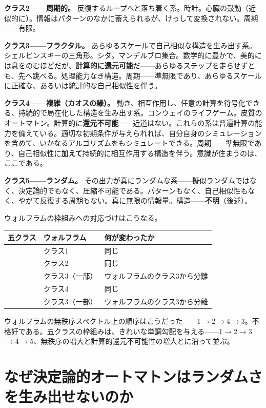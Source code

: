 \documentclass[11pt, twoside, openright]{book}
\begin{document}
\textbf{クラス2------周期的。} 反復するループへと落ち着く系。時計。心臓の鼓動（近似的に）。情報はパターンのなかに蓄えられるが、けっして変換されない。周期------有限。

\textbf{クラス3------フラクタル。} あらゆるスケールで自己相似な構造を生み出す系。シェルピンスキーの三角形。シダ。マンデルブロ集合。数学的に豊かで、美的には息をのむほどだが、\textbf{計算的に還元可能}だ------あらゆるステップを走らせずとも、先へ跳べる。処理能力なき構造。周期------準無限であり、あらゆるスケールに正確な、あるいは統計的な自己相似性を伴う。

\textbf{クラス4------複雑（カオスの縁）。} 動き、相互作用し、任意の計算を符号化できる、持続的で局在化した構造を生み出す系。コンウェイのライフゲーム。皮質のオートマトン。計算的に\textbf{還元不可能}------近道はない。これらの系は普遍計算の能力を備えている。適切な初期条件が与えられれば、自分自身のシミュレーションを含めて、いかなるアルゴリズムをもシミュレートできる。周期------準無限であり、自己相似性に\textbf{加えて}持続的に相互作用する構造を伴う。意識が住まうのは、ここである。

\textbf{クラス5------ランダム。} その出力が真にランダムな系------擬似ランダムではなく、決定論的でもなく、圧縮不可能である。パターンもなく、自己相似性もなく、やがて反復する周期もない。真に無限の情報量。構造------\textbf{不明}（後述）。

ウォルフラムの枠組みへの対応づけはこうなる。


{\small
\noindent
\begin{tabularx}{\linewidth}{>{\centering\arraybackslash}X >{\centering\arraybackslash}X X}
\toprule
\textbf{五クラス} & \textbf{ウォルフラム} & \textbf{何が変わったか} \\
\midrule
1 & クラス1 & 同じ \\[4pt]
2 & クラス2 & 同じ \\[4pt]
3 & クラス3（一部） & ウォルフラムのクラス3から分離 \\[4pt]
4 & クラス4 & 同じ \\[4pt]
5 & クラス3（一部） & ウォルフラムのクラス3から分離 \\[4pt]
\bottomrule
\end{tabularx}
}


ウォルフラムの無秩序スペクトル上の順序はこうだった------1$\rightarrow$2$\rightarrow$4$\rightarrow$3。不格好である。五クラスの枠組みは、きれいな単調勾配を与える------1$\rightarrow$2$\rightarrow$3$\rightarrow$4$\rightarrow$5、無秩序の増大と計算的還元不可能性の増大とに沿って並ぶ。

\section*{なぜ決定論的オートマトンはランダムさを生み出せないのか}
\end{document}

